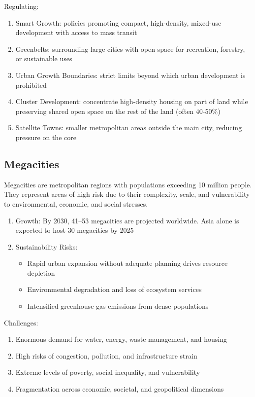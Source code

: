\documentclass[12pt, a4paper]{article}
\begin{document}
\begin{multicols*}{3}
Regulating:
\begin{enumerate}[\roman*.]
  \item Smart Growth: policies promoting compact, high-density, mixed-use development with access to mass transit
  \item Greenbelts: surrounding large cities with open space for recreation, forestry, or sustainable uses
  \item Urban Growth Boundaries: strict limits beyond which urban development is prohibited
  \item Cluster Development: concentrate high-density housing on part of land while preserving shared open space on the rest of the land (often 40-50\%)
  \item Satellite Towns: smaller metropolitan areas outside the main city, reducing pressure on the core
\end{enumerate}

\colbreak
\subsection{Megacities}
Megacities are metropolitan regions with populations exceeding 10 million people. They represent areas of high risk due to their complexity, scale, and vulnerability to environmental, economic, and social stresses.  

\begin{enumerate}[\roman*.]
  \item Growth: By 2030, 41--53 megacities are projected worldwide. Asia alone is expected to host 30 megacities by 2025
  \item Sustainability Risks:\vspace{2pt}
    \begin{itemize}[leftmargin=*]
      \item Rapid urban expansion without adequate planning drives resource depletion
      \item Environmental degradation and loss of ecosystem services
      \item Intensified greenhouse gas emissions from dense populations
    \end{itemize}
\end{enumerate}

Challenges:
\begin{enumerate}[\roman*.]
  \item Enormous demand for water, energy, waste management, and housing
  \item High risks of congestion, pollution, and infrastructure strain
  \item Extreme levels of poverty, social inequality, and vulnerability
  \item Fragmentation across economic, societal, and geopolitical dimensions
\end{enumerate}


\end{multicols*}
\end{document}
